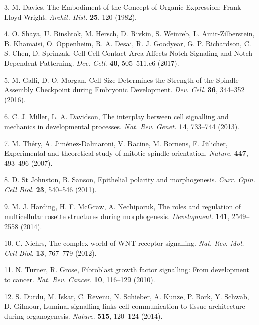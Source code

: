 \documentclass[11pt,singlespacinge,twoside]{reedthesis} %
\begin{document}
\leavevmode\hypertarget{ref-Davies1982}{}%
3. M. Davies, The Embodiment of the Concept of Organic Expression: Frank Lloyd Wright. \emph{Archit. Hist.} \textbf{25}, 120 (1982).

\leavevmode\hypertarget{ref-Shaya2017a}{}%
4. O. Shaya, U. Binshtok, M. Hersch, D. Rivkin, S. Weinreb, L. Amir-Zilberstein, B. Khamaisi, O. Oppenheim, R. A. Desai, R. J. Goodyear, G. P. Richardson, C. S. Chen, D. Sprinzak, Cell-Cell Contact Area Affects Notch Signaling and Notch-Dependent Patterning. \emph{Dev. Cell}. \textbf{40}, 505--511.e6 (2017).

\leavevmode\hypertarget{ref-Galli2016}{}%
5. M. Galli, D. O. Morgan, Cell Size Determines the Strength of the Spindle Assembly Checkpoint during Embryonic Development. \emph{Dev. Cell}. \textbf{36}, 344--352 (2016).

\leavevmode\hypertarget{ref-Miller2013}{}%
6. C. J. Miller, L. A. Davidson, The interplay between cell signalling and mechanics in developmental processes. \emph{Nat. Rev. Genet.} \textbf{14}, 733--744 (2013).

\leavevmode\hypertarget{ref-Thery2007}{}%
7. M. Théry, A. Jiménez-Dalmaroni, V. Racine, M. Bornens, F. Jülicher, Experimental and theoretical study of mitotic spindle orientation. \emph{Nature}. \textbf{447}, 493--496 (2007).

\leavevmode\hypertarget{ref-StJohnston2011}{}%
8. D. St Johnston, B. Sanson, Epithelial polarity and morphogenesis. \emph{Curr. Opin. Cell Biol.} \textbf{23}, 540--546 (2011).

\leavevmode\hypertarget{ref-Harding2014b}{}%
9. M. J. Harding, H. F. McGraw, A. Nechiporuk, The roles and regulation of multicellular rosette structures during morphogenesis. \emph{Development}. \textbf{141}, 2549--2558 (2014).

\leavevmode\hypertarget{ref-Niehrs2012}{}%
10. C. Niehrs, The complex world of WNT receptor signalling. \emph{Nat. Rev. Mol. Cell Biol.} \textbf{13}, 767--779 (2012).

\leavevmode\hypertarget{ref-Turner2010}{}%
11. N. Turner, R. Grose, Fibroblast growth factor signalling: From development to cancer. \emph{Nat. Rev. Cancer}. \textbf{10}, 116--129 (2010).

\leavevmode\hypertarget{ref-Durdu2014a}{}%
12. S. Durdu, M. Iskar, C. Revenu, N. Schieber, A. Kunze, P. Bork, Y. Schwab, D. Gilmour, Luminal signalling links cell communication to tissue architecture during organogenesis. \emph{Nature}. \textbf{515}, 120--124 (2014).
\end{document}
